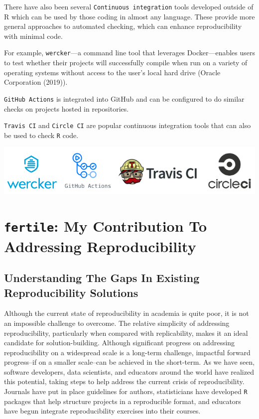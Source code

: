 \documentclass[12pt,twoside]{reedthesis}
\begin{document}
There have also been several \texttt{Continuous\ integration} tools
developed outside of R which can be used by those coding in almost any
language. These provide more general approaches to automated checking,
which can enhance reproducibility with minimal code.

For example, \texttt{wercker}---a command line tool that leverages
Docker---enables users to test whether their projects will successfully
compile when run on a variety of operating systems without access to the
user's local hard drive (Oracle Corporation (2019)).

\texttt{GitHub\ Actions} is integrated into GitHub and can be configured
to do similar checks on projects hosted in repositories.

\texttt{Travis\ CI} and \texttt{Circle\ CI} are popular continuous
integration tools that can also be used to check \texttt{R} code.
\begin{center}\includegraphics[width=0.8\linewidth]{figure/ci-tools} \end{center}

\chapter{\texorpdfstring{\texttt{fertile}: My Contribution To Addressing
Reproducibility}{fertile: My Contribution To Addressing Reproducibility}}\label{my-solution}

\section{Understanding The Gaps In Existing Reproducibility
Solutions}\label{understanding-the-gaps-in-existing-reproducibility-solutions}

Although the current state of reproducibility in academia is quite poor,
it is not an impossible challenge to overcome. The relative simplicity
of addressing reproducibility, particularly when compared with
replicability, makes it an ideal candidate for solution-building.
Although significant progress on addressing reproducibility on a
widespread scale is a long-term challenge, impactful forward
progress--if on a smaller scale--can be achieved in the short-term. As
we have seen, software developers, data scientists, and educators around
the world have realized this potential, taking steps to help address the
current crisis of reproducibility. Journals have put in place guidelines
for authors, statisticians have developed \texttt{R} packages that help
structure projects in a reproducible format, and educators have begun
integrate reproducibility exercises into their courses.
\end{document}
